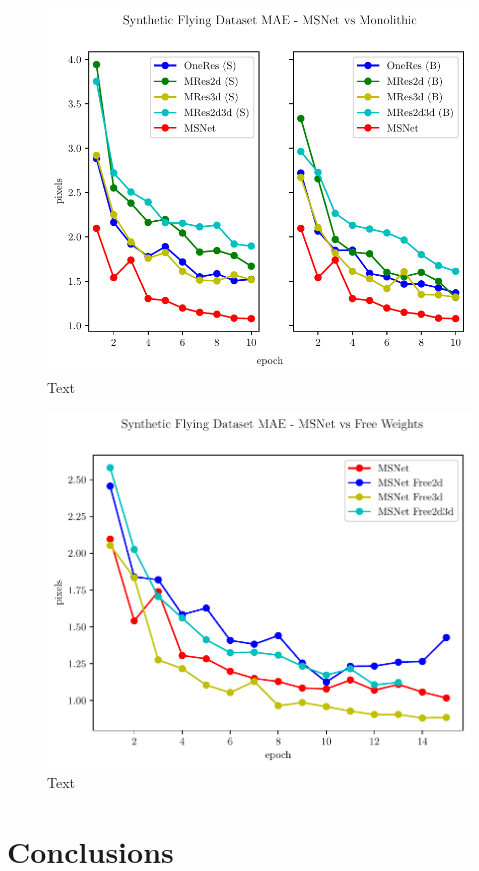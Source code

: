 \documentclass[10pt]{article}
\begin{document}
\begin{figure}
    \centering
    \includegraphics[width=\textwidth]{paper/latex/figures/freiburg_msnet_vs_monolithic_mae.pdf}
    \caption{Text}
    \label{fig:mae_SFNvsGenericNets}
\end{figure}


\begin{figure}
    \centering
    \includegraphics[width=\textwidth]{paper/latex/figures/freiburg_msnet_vs_free_weights_mae.pdf}
    \caption{Text}
    \label{fig:mae_SFNvsSFN_free_weights}
\end{figure}

\section{Conclusions}




\end{document}
